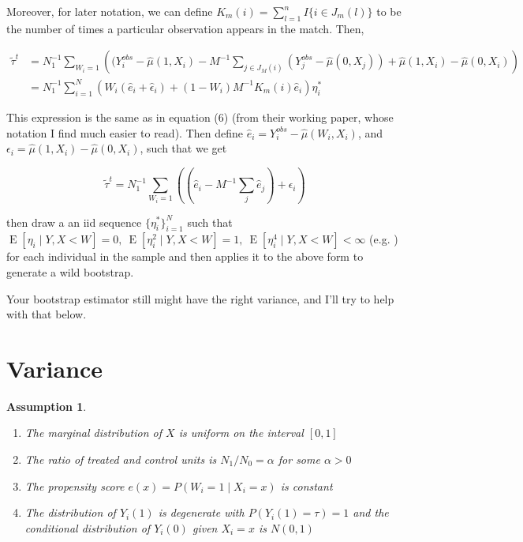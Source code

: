 \documentclass{article}
\newtheorem{assumption}{Assumption}[section]
\DeclareMathOperator{\E}{E}
\begin{document}
Moreover, for later notation, we can define $K_{m}(i) = \sum_{l = 1}^{n}I\{i \in J_{m}(l)\}$ to be the number of times a particular observation appears in the match. Then,

\begin{align*} \tilde \tau^{t} &= N_{1}^{-1}\sum_{W_{i} = 1}\left((Y_{i}^{obs}-\hat \mu(1,X_{i}) -M^{-1}\sum_{j \in J_{M}(i)}(Y_{j}^{obs}-\hat \mu(0,X_{j}))+\hat \mu(1,X_{i})-\hat \mu(0,X_{i})\right) \\
&= N_{1}^{-1}\sum_{i=1}^{N}(W_{i}(\hat e_{i}+\hat \epsilon_{i})+(1-W_{i})M^{-1}K_{m}(i)\hat e_{i})\eta_{i}^{*}
\end{align*}

This expression is the same as in \cite{OnR:16} equation (6) (from their working paper, whose notation I find much easier to read). Then define $\hat e_{i} = Y_{i}^{obs}-\hat \mu(W_{i},X_{i})$, and $\epsilon_{i} = \hat \mu(1,X_{i})-\hat \mu(0,X_{i})$, such that we get

$$\tilde \tau^{t} = N_{1}^{-1}\sum_{W_{i} = 1}\left((\hat e_{i}-M^{-1}\sum_{j}\hat e_{j})+\epsilon_{i}\right)$$

\cite{OnR:16} then draw a an iid sequence $\{\eta_{i}^{*}\}_{i=1}^{N}$ such that $\E[\eta_{i} \mid Y, X< W] = 0,\ \E[\eta_{i}^{2} \mid Y, X< W] = 1,\ \E[\eta_{i}^{4} \mid Y, X< W] < \infty$ (e.g. \cite{Mam:92}) for each individual in the sample and then applies it to the above form to generate a wild bootstrap.

Your bootstrap estimator still might have the right variance, and I'll try to help with that below.

\section{Variance}

\begin{assumption}
\begin{enumerate}
\item The marginal distribution of $X$ is uniform on the interval $[0,1]$
\item The ratio of treated and control units is $N_{1}/N_{0} = \alpha$ for some $\alpha > 0$
\item The propensity score $e(x) = P(W_{i} = 1 \mid X_{i} = x)$ is constant
\item The distribution of $Y_{i}(1)$ is degenerate with $P(Y_{i}(1) = \tau) = 1$ and the conditional distribution of $Y_{i}(0)$ given $X_{i} = x$ is $N(0,1)$
\end{enumerate}
\end{assumption}
\end{document}
